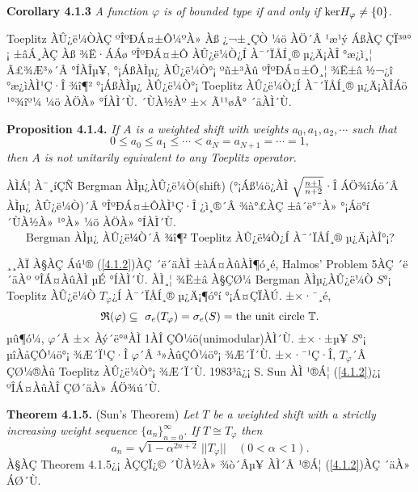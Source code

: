 \documentclass[12pt,a4paper,2sided]{article}
\begin{document}
\vspace{0.3cm} {\bf Corollary 4.1.3} {\sl  A function $\varphi$ is
of bounded type if and only if ${\rm ker}H_{\varphi}\neq\{0\}$. }

\vspace{0.3cm} Toeplitz ÀÛ¿ë¼ÒÀÇ ºÎºÐÁ¤±Ô¼ºÀ» Àß ¿¬±¸ÇÒ ¼ö ÀÖ´Â ¹æ¹ý
ÁßÀÇ ÇÏ³ª°¡ ±âÁ¸ÀÇ Àß ¾Ë·ÁÁø ºÎºÐÁ¤±Ô ÀÛ¿ë¼Ò¿Í À¯´ÏÅÍ¸® µ¿Ä¡ÀÎ
°æ¿ì¸¦ Ã£¾Æ³»´Â °ÍÀÎµ¥, °¡ÁßÀÌµ¿ ÀÛ¿ë¼Ò°¡ ºñ±³Àû ºÎºÐÁ¤±Ô¸¦ ¾Ë±â
½¬¿î °æ¿ìÀÌ¹Ç·Î ¾î¶² °¡ÁßÀÌµ¿ ÀÛ¿ë¼Ò°¡ Toeplitz ÀÛ¿ë¼Ò¿Í À¯´ÏÅÍ¸®
µ¿Ä¡ÀÎÁö ¹°¾îº¼ ¼ö ÀÖÀ» °ÍÀÌ´Ù. ´ÙÀ½Àº ±× Ã¹¹øÂ° ´äÀÌ´Ù.


\newpage{} \vspace{0.8cm}

{\bf Proposition 4.1.4.} {\sl If $A$ is a weighted shift with
weights $a_0, a_1, a_2, \cdots $ such that
$$
0\le a_0 \le a_1 \le \cdots < a_N = a_{N+1}= \cdots = 1,
$$
then $A$ is not unitarily equivalent to any Toeplitz operator. }

\vspace{.2 cm} ÀÌÁ¦ À¯¸íÇÑ Bergman ÀÌµ¿ÀÛ¿ë¼Ò(shift) (°¡Áß¼ö¿­ÀÌ
$\sqrt{{n+1}\over{n+2}}$·Î ÁÖ¾îÁö´Â ÀÌµ¿ ÀÛ¿ë¼Ò)´Â ºÎºÐÁ¤±ÔÀÌ¹Ç·Î
¿ì¸®´Â ¾à°£ÀÇ ±â´ë°¨À» °¡Áö°í ´ÙÀ½À» ¹°À» ¼ö ÀÖÀ» °ÍÀÌ´Ù.
\begin{equation}\label{4.1.2}
\mbox{Bergman ÀÌµ¿ ÀÛ¿ë¼Ò´Â ¾î¶² Toeplitz ÀÛ¿ë¼Ò¿Í À¯´ÏÅÍ¸®
µ¿Ä¡ÀÎ°¡?}
\end{equation}

¸¸ÀÏ À§ÀÇ Áú¹® (\ref{4.1.2})ÀÇ ´ë´äÀÌ ±àÁ¤ÀûÀÌ¶ó¸é, Halmos' Problem
5ÀÇ ´ë´äÀº ºÎÁ¤ÀûÀÌ µÉ °ÍÀÌ´Ù. ÀÌ¸¦ ¾Ë±â À§ÇØ¼­ Bergman ÀÌµ¿ÀÛ¿ë¼Ò
$S$°¡ Toeplitz ÀÛ¿ë¼Ò $T_\varphi$¿Í À¯´ÏÅÍ¸® µ¿Ä¡¶ó°í °¡Á¤ÇÏÀÚ.
±×·¯¸é,
$$
\frak{R}(\varphi)\subseteq\ \sigma
_e(T_\varphi )=\sigma_e(S)=\mbox{the unit circle}\ \mathbb{T}.
$$
µû¶ó¼­, $\varphi$´Â ±× Àý´ë°ªÀÌ 1ÀÎ ÇÔ¼ö(unimodular)ÀÌ´Ù. ±×·±µ¥
$S$°¡ µîÀåÇÔ¼ö°¡ ¾Æ´Ï¹Ç·Î $\varphi$´Â ³»ÀûÇÔ¼ö°¡ ¾Æ´Ï´Ù. ±×·¯¹Ç·Î,
$T_\varphi$´Â ÇØ¼®Àû Toeplitz ÀÛ¿ë¼Ò°¡ ¾Æ´Ï´Ù. 1983³â¿¡ S. Sun
\cite{Sun}ÀÌ ¹®Á¦ (\ref{4.1.2})¿¡ ºÎÁ¤ÀûÀÎ ÇØ´äÀ» ÁÖ¾ú´Ù. \vspace{.2
cm}

{\bf Theorem 4.1.5.} (Sun's Theorem) {\rm \cite{Sun}} {\sl Let $T$
be a weighted shift with a strictly increasing weight sequence
$\{a_{n}\}_{n=0}^{\infty}$. If $T\cong T_{\varphi}$ then
$$
a_{n}=\sqrt{1-{\alpha}^{2n+2}} \,||T_{\varphi}||\quad (0<\alpha <1).
$$}
\indent À§ÀÇ Theorem 4.1.5¿¡ ÀÇÇÏ¿© ´ÙÀ½À» ¾ò´Âµ¥ ÀÌ´Â ¹®Á¦
(\ref{4.1.2})ÀÇ ´äÀ» ÁØ´Ù. \vspace{.2 cm}
\end{document}
